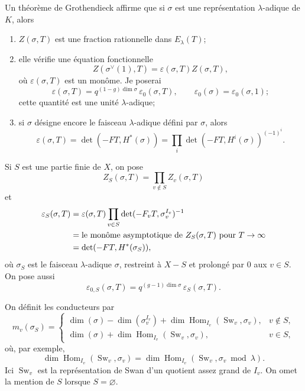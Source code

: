 \documentclass[11pt]{article}
\newcommand{\Hom}{\operatorname{Hom}}
\newcommand{\Sw}{\operatorname{Sw}}
\newcommand{\eps}{\varepsilon}
\begin{document}
Un théorème de Grothendieck affirme que si \(\sigma\) est une représentation \(\lambda\)-adique de \(K\), alors
\begin{enumerate}[label=\alph*)]
\item \(Z(\sigma,T)\) est une fraction rationnelle dans \(E_\lambda(T)\);
\item elle vérifie une équation fonctionnelle
\[
Z(\sigma^\vee(1),T)=\eps(\sigma,T)Z(\sigma,T),
\]
où \(\eps(\sigma,T)\) est un monôme. Je poserai
\[
\eps(\sigma,T)=q^{(1-g)\dim\sigma}\,\eps_0(\sigma,T),\qquad
\eps_0(\sigma)=\eps_0(\sigma,1);
\]
cette quantité est une unité \(\lambda\)-adique;
\item si \(\sigma\) désigne encore le faisceau \(\lambda\)-adique défini par \(\sigma\), alors
\[
\eps(\sigma,T)=\det(-FT,H^\ast(\sigma))
=\prod_i\det(-FT,H^i(\sigma))^{(-1)^i}.
\]
\end{enumerate}

Si \(S\) est une partie finie de \(X\), on pose
\[
Z_S(\sigma,T)=\prod_{v\notin S} Z_v(\sigma,T)
\]
et
\[
\begin{aligned}
\eps_S(\sigma,T)
&=\eps(\sigma,T)\prod_{v\in S}
\det(-F_vT,\sigma_v^{I_v})^{-1}  \\
&=\hbox{le monôme asymptotique de }Z_S(\sigma,T)\hbox{ pour }T\to\infty \\
&=\det(-FT,H^\ast(\sigma_S)),
\end{aligned}
\]
où \(\sigma_S\) est le faisceau \(\lambda\)-adique \(\sigma\), restreint à \(X-S\) et prolongé par \(0\) aux \(v\in S\). On pose aussi
\[
\eps_{0,S}(\sigma,T)=q^{(g-1)\dim\sigma}\,\eps_S(\sigma,T).
\]

On définit les conducteurs par
\[
m_v(\sigma_S)=
\begin{cases}
\dim(\sigma)-\dim(\sigma_v^{I_v})
+\dim\Hom_{I_v}(\Sw_v,\sigma_v), & v\notin S,\\[4pt]
\dim(\sigma)+\dim\Hom_{I_v}(\Sw_v,\sigma_v), & v\in S,
\end{cases}
\]
où, par exemple,
\[
\dim\Hom_{I_v}(\Sw_v,\sigma_v)
=
\dim\Hom_{I_v}(\Sw_v,\sigma_v \bmod \lambda).
\]
Ici \(\Sw_v\) est la représentation de Swan d'un quotient assez grand de \(I_v\). On omet la mention de \(S\) lorsque \(S=\varnothing\).
\end{document}
